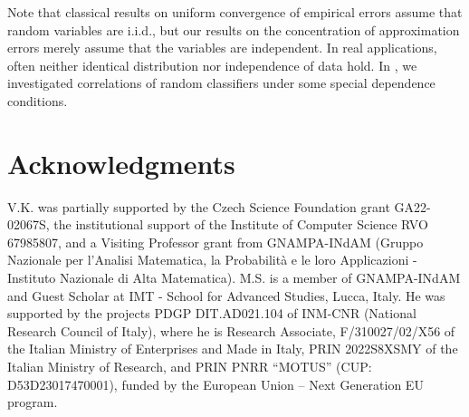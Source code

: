 \documentclass{elsarticle}
\begin{document}
Note that classical results on uniform convergence of empirical errors assume that random variables are i.i.d., but our results on the concentration of approximation errors merely assume that the variables are independent. In real applications,  often neither identical distribution nor independence of data hold. In \cite{vksa21}, we investigated correlations of random classifiers under some special dependence conditions.




 \section*{Acknowledgments}
V.K. was partially supported by the Czech Science Foundation grant GA22-02067S, the institutional support of the Institute of Computer
Science RVO 67985807, and a Visiting Professor grant from GNAMPA-INdAM
(Gruppo Nazionale per l’Analisi Matematica, la Probabilità
e le loro Applicazioni - Instituto Nazionale di Alta Matematica). M.S. is a member of
GNAMPA-INdAM and Guest Scholar  at IMT - School for Advanced Studies, Lucca,
Italy. He was supported by the projects PDGP
DIT.AD021.104 of INM-CNR (National Research Council of Italy),
where he is Research Associate,  F/310027/02/X56 of the Italian Ministry of Enterprises and Made in Italy,  PRIN 2022S8XSMY of the Italian Ministry of Research, and PRIN PNRR “MOTUS” (CUP: D53D23017470001), funded by the European Union – Next Generation EU program.
\end{document}
